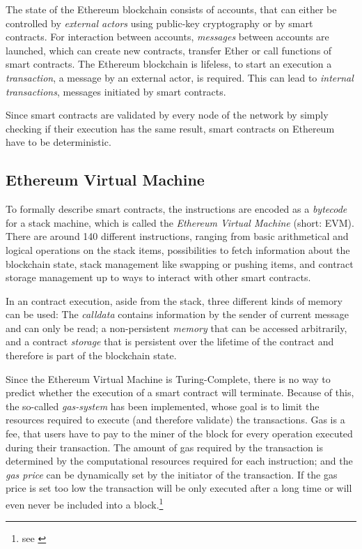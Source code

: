 The state of the Ethereum blockchain consists of accounts, that can either be controlled by \textit{external actors} using public-key cryptography or by smart contracts. For interaction between accounts, \textit{messages} between accounts are launched, which can create new contracts, transfer Ether or call functions of smart contracts. The Ethereum blockchain is lifeless, to start an execution a \textit{transaction}, a message by an external actor, is required. This can lead to \textit{internal transactions}, messages initiated by smart contracts.

Since smart contracts are validated by every node of the network by simply checking if their execution has the same result, smart contracts on Ethereum have to be deterministic.

\subsection{Ethereum Virtual Machine}
\label{section:deepdive:evm}

To formally describe smart contracts, the instructions are encoded as a \textit{bytecode} for a stack machine, which is called the \textit{Ethereum Virtual Machine} (short: EVM). There are around 140 different instructions, ranging from basic arithmetical and logical operations on the stack items, possibilities to fetch information about the blockchain state, stack management like swapping or pushing items, and contract storage management up to ways to interact with other smart contracts.

In an contract execution, aside from the stack, three different kinds of memory can be used: The \textit{calldata} contains information by the sender of current message and can only be read; a non-persistent \textit{memory} that can be accessed arbitrarily, and a contract \textit{storage} that is persistent over the lifetime of the contract and therefore is part of the blockchain state.

Since the Ethereum Virtual Machine is Turing-Complete, there is no way to predict whether the execution of a smart contract will terminate. Because of this, the so-called \textit{gas-system} has been implemented, whose goal is to limit the resources required to execute (and therefore validate) the transactions. Gas is a fee, that users have to pay to the miner of the block for every operation executed during their transaction. The amount of gas required by the transaction is determined by the computational resources required for each instruction; and the \textit{gas price} can be dynamically set by the initiator of the transaction. If the gas price is set too low the transaction will be only executed after a long time or will even never be included into a block.\footnote{see \cite[Whitepaper]{ethereum:wiki}}

